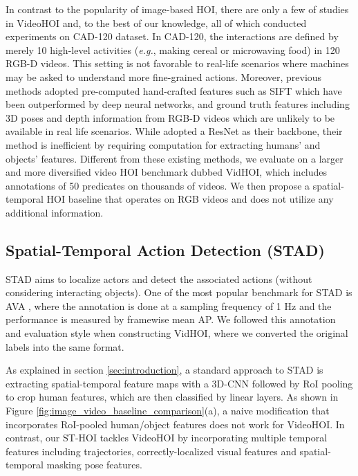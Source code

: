 \documentclass[sigconf]{acmart}
\begin{document}
In contrast to the popularity of image-based HOI, there are only a few of studies in VideoHOI \cite{koppula2015anticipating,jain2016structural,qi2018learning,sunkesula2020lighten} and, to the best of our knowledge, all of which conducted experiments on CAD-120 \cite{koppula2013learning} dataset.
In CAD-120, the interactions are defined by merely 10 high-level activities (\emph{e.g.}, {\selectfont making cereal} or {\selectfont microwaving food}) in 120 RGB-D videos. This setting is not favorable to real-life scenarios where machines may be asked to understand more fine-grained actions.
Moreover, previous methods \cite{koppula2015anticipating,jain2016structural,qi2018learning} adopted pre-computed hand-crafted features such as SIFT \cite{lowe2004distinctive} which have been outperformed by deep neural networks, and ground truth features including 3D poses and depth information from RGB-D videos which are unlikely to be available in real life scenarios.
While \cite{sunkesula2020lighten} adopted a ResNet \cite{he2016deep} as their backbone, their method is inefficient by requiring  computation for extracting  humans' and  objects' features. 
Different from these existing methods, we evaluate on a larger and more diversified video HOI benchmark dubbed VidHOI, which includes annotations of 50 predicates on thousands of videos. 
We then propose a spatial-temporal HOI baseline that operates on RGB videos and does not utilize any additional information.

\subsection{Spatial-Temporal Action Detection (STAD)}
\label{subsec:stad}
STAD aims to localize actors and detect the associated actions (without considering interacting objects). 
One of the most popular benchmark for STAD is AVA \cite{gu2018ava}, where the annotation is done at a sampling frequency of 1 Hz and the performance is measured by framewise mean AP. 
We followed this annotation and evaluation style when constructing VidHOI, where we converted the original labels into the same format. 

As explained in section \ref{sec:introduction}, a standard approach to STAD \cite{tran2015learning,carreira2017quo} is extracting spatial-temporal feature maps with a 3D-CNN followed by RoI pooling to crop human features, which are then classified by linear layers. 
As shown in Figure \ref{fig:image_video_baseline_comparison}(a), a naive modification that incorporates RoI-pooled human/object features does not work for VideoHOI.
In contrast, our ST-HOI tackles VideoHOI by incorporating multiple temporal features including trajectories, correctly-localized visual features and spatial-temporal masking pose features.
\end{document}
